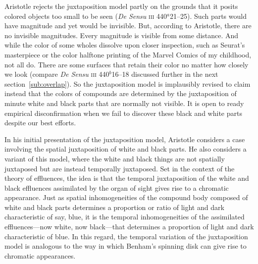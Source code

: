 Aristotle rejects the juxtaposition model partly on the grounds that it posits colored objects too small to be seen (\emph{De Sensu} \textsc{iii} 440\( ^{a} \)21--25). Such parts would have magnitude and yet would be invisible. But, according to Aristotle, there are no invisible magnitudes. Every magnitude is visible from some distance. And while the color of some wholes dissolve upon closer inspection, such as Seurat's masterpiece or the color halftone printing of the Marvel Comics of my childhood, not all do. There are some surfaces that retain their color no matter how closely we look (compare \emph{De Sensu} \textsc{iii} 440\( ^{b} \)16--18 discussed further in the next section~\ref{sub:overlap}). So the juxtaposition model is implausibly revised to claim instead that the colors of compounds are determined by the juxtaposition of minute white and black parts that are normally not visible. It is open to ready empirical disconfirmation when we fail to discover these black and white parts despite our best efforts.


In his initial presentation of the juxtaposition model, Aristotle considers a case involving the spatial juxtaposition of white and black parts. He also considers a variant of this model, where the white and black things are not spatially juxtaposed but are instead temporally juxtaposed. Set in the context of the theory of effluences, the idea is that the temporal juxtaposition of the white and black effluences assimilated by the organ of sight gives rise to a chromatic appearance. Just as spatial inhomogeneities of the compound body composed of white and black parts determines a proportion or ratio of light and dark characteristic of say, blue, it is the temporal inhomogeneities of the assimilated effluences---now white, now black---that determines a proportion of light and dark characteristic of blue. In this regard, the temporal variation of the juxtaposition model is analogous to the way in which Benham's spinning disk can give rise to chromatic appearances.

